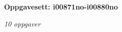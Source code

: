 \centerline{\bf Oppgavesett: i00871no-i00880no}
\vskip 10pt
\centerline{\it 10 oppgaver}\vskip 10pt
\vskip 10pt

